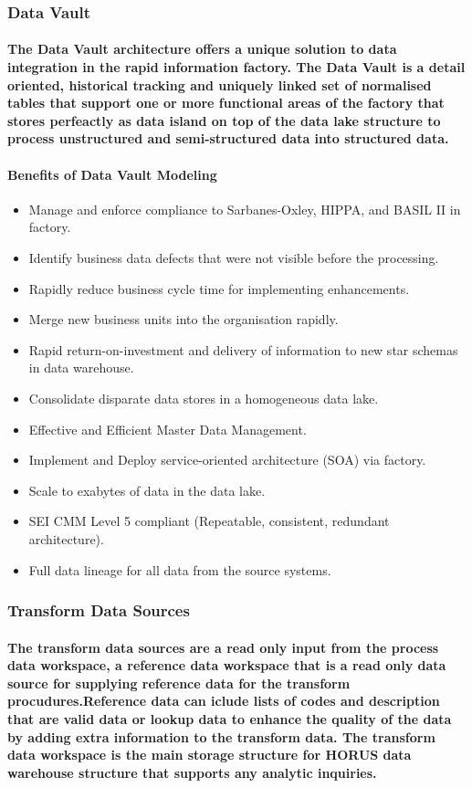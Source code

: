 \subsubsection{Data Vault}
\paragraph{The Data Vault architecture offers a unique solution to data integration in the rapid information factory. The Data Vault is a detail oriented, historical tracking and uniquely linked set of normalised tables that support one or more functional areas of the factory that stores perfeactly as data island on top of the data lake structure to process unstructured and semi-structured data into structured data.}
\paragraph{Benefits of Data Vault Modeling}
\begin{itemize}
\item Manage and enforce compliance to Sarbanes-Oxley, HIPPA, and BASIL II in factory.
\item Identify business data defects that were not visible before the processing.
\item Rapidly reduce business cycle time for implementing enhancements.
\item Merge new business units into the organisation rapidly.
\item Rapid return-on-investment and delivery of information to new star schemas in data warehouse.
\item Consolidate disparate data stores in a homogeneous data lake.
\item Effective and Efficient Master Data Management.
\item Implement and Deploy service-oriented architecture (SOA) via factory.
\item Scale to exabytes of data in the data lake.
\item SEI CMM Level 5 compliant (Repeatable, consistent, redundant architecture).
\item Full data lineage for all data from the source systems.
\end{itemize}
\subsubsection{Transform Data Sources}
\paragraph{The transform data sources are a read only input from the process data workspace, a reference data workspace that is a read only data source for supplying reference data for the transform procudures.Reference data can iclude lists of codes and description that are valid data or lookup data to enhance the quality of the data by adding extra information to the transform data. The transform data workspace is the main storage structure for HORUS data warehouse structure that supports any analytic inquiries.}
